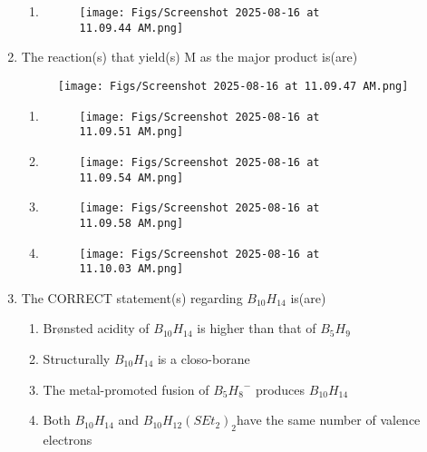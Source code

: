 \documentclass[12pt]{article}
\begin{document}
\begin{enumerate}
\begin{enumerate}
\item  
\begin{figure}[H]
\centering
\texttt{[image: Figs/Screenshot 2025-08-16 at 11.09.44 AM.png]}
\caption{}
\end{figure}

\end{enumerate}



\item The reaction(s) that yield(s) M as the major product is(are)
\begin{figure}[H]
\centering
\texttt{[image: Figs/Screenshot 2025-08-16 at 11.09.47 AM.png]}
\caption{}
\end{figure}
  

\begin{enumerate} 
    \item \begin{figure}[H]
\centering
\texttt{[image: Figs/Screenshot 2025-08-16 at 11.09.51 AM.png]}
\caption{}
\end{figure}

\item  \begin{figure}[H]
\centering
\texttt{[image: Figs/Screenshot 2025-08-16 at 11.09.54 AM.png]}
\caption{}
\end{figure}


\item  \begin{figure}[H]
\centering
\texttt{[image: Figs/Screenshot 2025-08-16 at 11.09.58 AM.png]}
\caption{}
\end{figure}

\item  
\begin{figure}[H]
\centering
\texttt{[image: Figs/Screenshot 2025-08-16 at 11.10.03 AM.png]}
\caption{}
\end{figure}  
\end{enumerate}



\item The CORRECT statement(s) regarding $B_{10}H_{14}$ is(are)

\begin{enumerate}
    \item Brønsted acidity of $B_{10}H_{14}$ is higher than that of $B_{5}H_{9}$
    \item Structurally $B_{10}H_{14}$ is a closo-borane
    \item The metal-promoted fusion of ${B_{5}H_{8}}^-$ produces $B_{10}H_{14}$
    \item Both $B_{10}H_{14}$ and $B_{10}H_{12}(SEt_2)_2$have the same number of valence electrons
\end{enumerate}


\end{enumerate}
\end{document}
